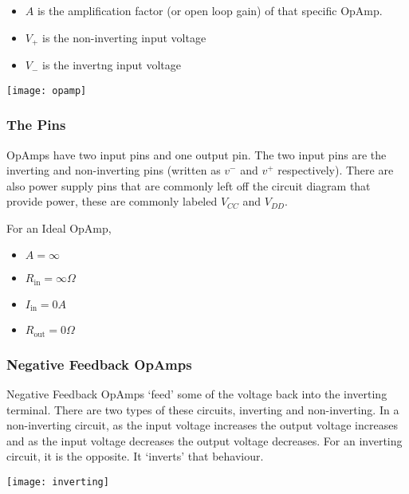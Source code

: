\documentclass[12pt]{article}
\begin{document}
\begin{itemize}
  \item $A$ is the amplification factor (or open loop gain) of that specific OpAmp. 
  \item $V_+$ is the non-inverting input voltage 
  \item $V_-$ is the invertng input voltage
\end{itemize}

\begin{marginfigure}
  \texttt{[image: opamp]}
\end{marginfigure}

\subsubsection{The Pins}
OpAmps have two input pins and one output pin.
The two input pins are the inverting and non-inverting pins (written as $v^{-}$ and $v^{+}$ respectively).
There are also power supply pins that are commonly left off the circuit diagram that provide power, these are commonly labeled $V_{CC}$ and $V_{DD}$.

\begin{marginfigure}
  \vspace{ 2cm }
  For an Ideal OpAmp,
  \begin{itemize}
    \item $A = \infty$
    \item $R_{\text{in}} = \infty\Omega$
    \item $I_{\text{in}} = 0A$
    \item $R_{\text{out}} = 0\Omega$
  \end{itemize}
\end{marginfigure}

\subsubsection{Negative Feedback OpAmps}
Negative Feedback OpAmps `feed' some of the voltage back into the inverting terminal.
There are two types of these circuits, inverting and non-inverting.
In a non-inverting circuit, as the input voltage increases the output voltage increases and as the input voltage decreases the output voltage decreases.
For an inverting circuit, it is the opposite.
It `inverts' that behaviour.

\begin{center}
  \texttt{[image: inverting]}
\end{center}
\end{document}
